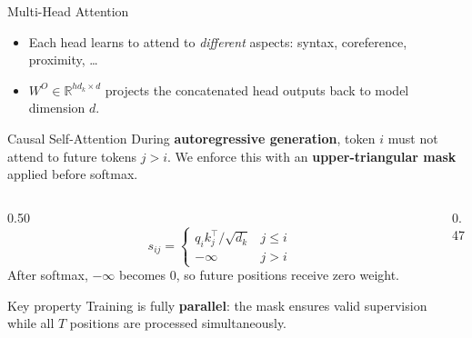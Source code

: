 \begin{frame}{Multi-Head Attention}
\begin{center}
\begin{tikzpicture}
  \end{tikzpicture}
  \end{center}

  \begin{itemize}
    \item Each head learns to attend to \emph{different} aspects: syntax, coreference, proximity, \ldots
    \item $W^O \in \mathbb{R}^{hd_k \times d}$ projects the concatenated head outputs back to model dimension $d$.
  \end{itemize}
\end{frame}

\begin{frame}{Causal Self-Attention}
  During \textbf{autoregressive generation}, token $i$ must not attend to future tokens $j > i$.
  We enforce this with an \textbf{upper-triangular mask} applied before softmax.

  \begin{columns}[T]
    \begin{column}{0.50\textwidth}
      \vspace{0.3em}
      \[
        s_{ij} = \begin{cases} q_i k_j^\top / \sqrt{d_k} & j \le i \\ -\infty & j > i \end{cases}
      \]
      After softmax, $-\infty$ becomes $0$, so future positions receive zero weight.

      \vspace{0.5em}
      \begin{alertblock}{Key property}
        Training is fully \textbf{parallel}: the mask ensures valid supervision while all $T$ positions are processed simultaneously.
      \end{alertblock}
    \end{column}
    \begin{column}{0.47\textwidth}
      \begin{center}
\end{center}
\end{column}
\end{columns}
\end{frame}
